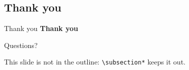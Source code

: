 
\subsection*{Thank you}
\begin{frame}{Thank you}
    \darkslide
    {\Huge\bfseries Thank you}\par\bigskip
    {\Large Questions?}\par\bigskip\bigskip
    {\small This slide is not in the outline: \texttt{\textbackslash subsection*} keeps it out.}
\end{frame}
